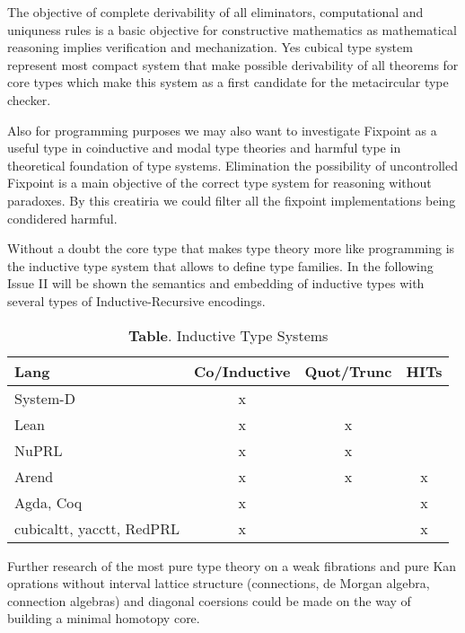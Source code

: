 \documentclass{article}
\theoremstyle{definition}
\begin{document}
The objective of complete derivability of all eliminators, computational and uniquness rules
is a basic objective for constructive mathematics as mathematical reasoning implies verification
and mechanization. Yes cubical type system represent most compact system that make possible
derivability of all theorems for core types which make this system as a first candidate for
the metacircular type checker.

Also for programming purposes we may also want to investigate Fixpoint as a useful
type in coinductive and modal type theories and harmful type in theoretical foundation of type systems.
Elimination the possibility of uncontrolled Fixpoint is a main objective of the correct type system
for reasoning without paradoxes. By this creatiria we could filter all the fixpoint implementations being condidered harmful.

Without a doubt the core type that makes type theory more
like programming is the inductive type system that allows to
define type families. In the following Issue II will be shown
the semantics and embedding of inductive types with several types
of Inductive-Recursive encodings.

\begin{table}[!ht]
  \centering
  \caption*{\textbf{Table}. Inductive Type Systems}
  \begin{adjustbox}{width=\columnwidth,center}
  \begin{tabular}{lccc}
    \hline
       Lang & Co/Inductive & Quot/Trunc & HITs\\
    \hline
       System-D & x\\
       Lean & x & x\\
       NuPRL & x & x\\
       Arend & x & x & x\\
       Agda, Coq & x & & x\\
       cubicaltt, yacctt, RedPRL & x & & x\\
  \end{tabular}
  \end{adjustbox}
\end{table}

Further research of the most pure type theory on a weak fibrations and pure Kan
oprations without interval lattice structure (connections, de Morgan algebra, connection
algebras) and diagonal coersions could be made on the way of building a minimal homotopy core\cite{Cavallo19}.
\end{document}
